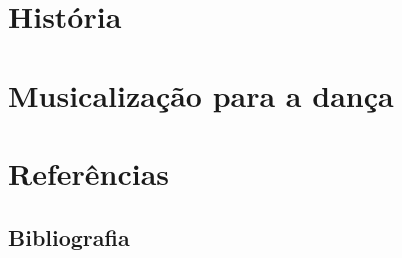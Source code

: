 \documentclass[12pt]{extbook} %
\def \SourceRootPath{.}
\begin{document}
\part{História}




\part{Musicalização para a dança}





\part{Referências}



\chapter*{Bibliografia}
\printbibliography[heading=bibempty]




\cleardoublepage
{}
\setlength{\columnsep}{0.75cm}
\printindex



\end{document}
